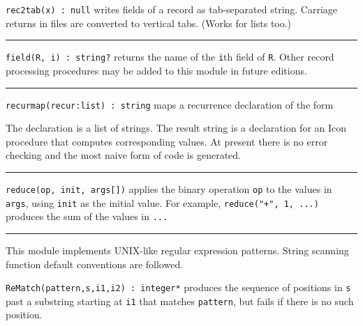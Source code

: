 \texttt{rec2tab(x) : null} writes fields of a record as tab-separated
string. Carriage returns in files are converted to vertical tabs.
(Works for lists too.) \ 

\vspace{0.25cm}\hrule{}

\texttt{field(R, i) : string?} returns the name of the \texttt{i}th
field of \texttt{R}. Other record processing procedures may be added to
this module in future editions. 

\vspace{0.25cm}\hrule{}

\texttt{recurmap(recur:list) : string} maps a recurrence declaration of
the form

The declaration is a list of strings. The result string is a
declaration for an Icon procedure that computes corresponding values.
At present there is no error checking and the most naive form of code
is generated. 

\vspace{0.25cm}\hrule{}

\texttt{reduce(op, init, args[])} applies the binary
operation \texttt{op} to the values in \texttt{args}, using
\texttt{init} as the initial value. For example,
\texttt{reduce("+", 1, ...)} produces
the sum of the values in \texttt{...}

\vspace{0.25cm}\hrule{}

This module implements UNIX-like regular
expression patterns. %
String scanning function default conventions are followed.

\texttt{ReMatch(pattern,s,i1,i2) : integer*} produces the sequence of
positions in \texttt{s} past a substring starting at \texttt{i1} that
matches \texttt{pattern}, but fails if there is no such position.

